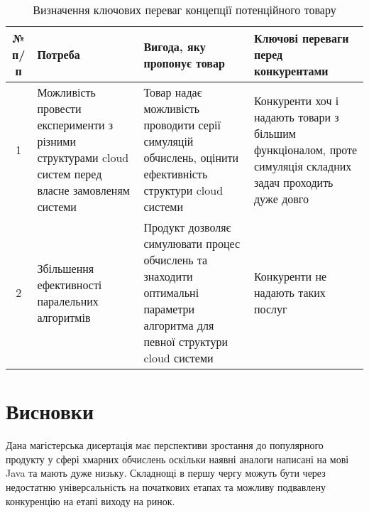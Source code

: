 \begin{table}[H]
	\centering
	\begin{tabular}{|c|p{4cm}|p{4cm}|p{4cm}|} \hline
		№ п/п
		& Потреба
		& Вигода, яку пропонує товар
		& Ключові переваги перед конкурентами 
		\\ \hline
		
		1
		& Можливість провести експерименти з різними структурами cloud систем перед власне замовленям системи 
		& Товар надає можливість проводити серії симуляцій обчислень, оцінити ефективність структури cloud системи
		& Конкуренти хоч і надають товари з більшим функціоналом, проте симуляція складних задач проходить дуже довго
		\\ \hline
		
		2
		& Збільшення ефективності паралельних алгоритмів
		& Продукт дозволяє симулювати процес обчислень та знаходити оптимальні параметри алгоритма для певної структури cloud системи
		& Конкуренти не надають таких послуг
		\\ \hline
	\end{tabular}
	\caption{Визначення ключових переваг концепції потенційного товару}
\end{table}



\section{Висновки}
Дана магістерська дисертація має перспективи зростання до популярного продукту у сфері хмарних обчислень оскільки наявні аналоги написані на мові Java та мають дуже низьку. Складнощі в першу чергу можуть бути через недостатню універсальність на початкових етапах та можливу подвавлену конкуренцію на етапі виходу на ринок.
\hspace{10pt}

